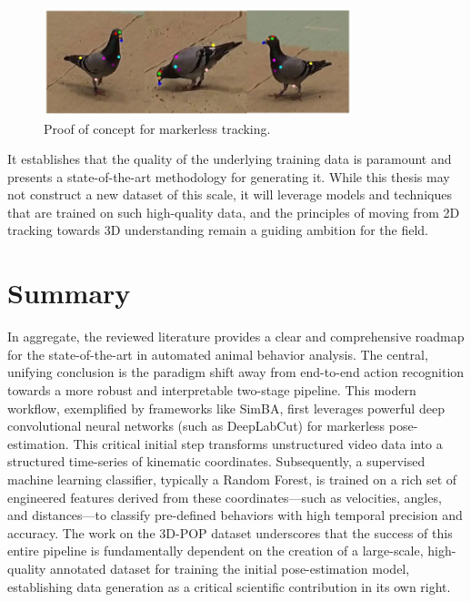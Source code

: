 \begin{figure}[H]
    \centering
    \includegraphics[width=0.8\textwidth]{archivos/figuras/pigeons.jpg} 
    \caption{Proof of concept for markerless tracking.}
    \label{fig:markerless_prediction}
\end{figure}

It establishes that the quality of the underlying training data is paramount and presents a state-of-the-art methodology for generating it. While this thesis may not construct a new dataset of this scale, it will leverage models and techniques that are trained on such high-quality data, and the principles of moving from 2D tracking towards 3D understanding remain a guiding ambition for the field.


\section{Summary}

In aggregate, the reviewed literature provides a clear and comprehensive roadmap for the state-of-the-art in automated animal behavior analysis. The central, unifying conclusion is the paradigm shift away from end-to-end action recognition towards a more robust and interpretable two-stage pipeline. This modern workflow, exemplified by frameworks like SimBA, first leverages powerful deep convolutional neural networks (such as DeepLabCut) for markerless pose-estimation. This critical initial step transforms unstructured video data into a structured time-series of kinematic coordinates. Subsequently, a supervised machine learning classifier, typically a Random Forest, is trained on a rich set of engineered features derived from these coordinates—such as velocities, angles, and distances—to classify pre-defined behaviors with high temporal precision and accuracy. The work on the 3D-POP dataset underscores that the success of this entire pipeline is fundamentally dependent on the creation of a large-scale, high-quality annotated dataset for training the initial pose-estimation model, establishing data generation as a critical scientific contribution in its own right.

